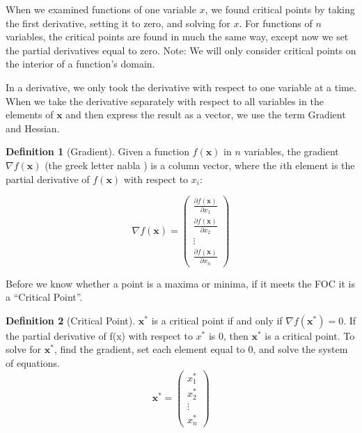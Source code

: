 \documentclass[
]{book}
\theoremstyle{definition}
\newtheorem{definition}{Definition}[chapter]
\theoremstyle{definition}
\theoremstyle{definition}
\theoremstyle{remark}
\begin{document}
When we examined functions of one variable \(x\), we found critical points by taking the first derivative, setting it to zero, and solving for \(x\). For functions of \(n\) variables, the critical points are found in much the same way, except now we set the partial derivatives equal to zero. Note: We will only consider critical points on the interior of a function's domain.

In a derivative, we only took the derivative with respect to one variable at a time. When we take the derivative separately with respect to all variables in the elements of \(\mathbf{x}\) and then express the result as a vector, we use the term Gradient and Hessian.

\begin{definition}[Gradient]
\protect\hypertarget{def:unnamed-chunk-52}{}{\label{def:unnamed-chunk-52} {} }
Given a function \(f(\textbf{x})\) in \(n\) variables, the gradient \(\nabla f(\mathbf{x})\) (the greek letter nabla ) is a column vector, where the \(i\)th element is the partial derivative of \(f(\textbf{x})\) with respect to \(x_i\):

\[\nabla f(\mathbf{x}) = \begin{pmatrix}
\frac{\partial f(\mathbf{x})}{\partial x_1}\\ \frac{\partial f(\mathbf{x})}{\partial x_2}\\
  \vdots \\ \frac{\partial f(\mathbf{x})}{\partial x_n} \end{pmatrix}\]
\end{definition}

Before we know whether a point is a maxima or minima, if it meets the FOC it is a ``Critical Point''.

\begin{definition}[Critical Point]
\protect\hypertarget{def:unnamed-chunk-53}{}{\label{def:unnamed-chunk-53} {} }
\(\mathbf{x}^*\) is a critical point if and only if \(\nabla f(\mathbf{x}^*)=0\). If the partial derivative of f(x) with respect to \(x^*\) is 0, then \(\mathbf{x}^*\) is a critical point. To solve for \(\mathbf{x}^*\), find the gradient, set each element equal to 0, and solve the system of equations. \[\mathbf{x}^* = \begin{pmatrix} x_1^*\\x_2^*\\ \vdots \\ x_n^*\end{pmatrix}\]
\end{definition}
\end{document}
